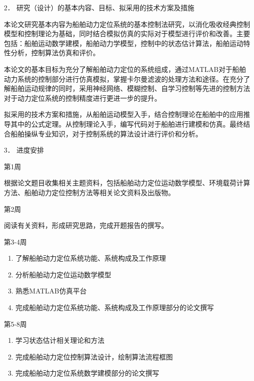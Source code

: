 \documentclass[a4paper,fontset=fandol]{ctexart}
\begin{document}
\begin{mdframed}
{\large \fangsong 
\begin{flushleft}
2．	研究（设计）的基本内容、目标、拟采用的技术方案及措施
\end{flushleft}

本论文研究基本内容为船舶动力定位系统的基本控制法研究，以消化吸收经典控制模型和控制理论为基础，同时结合模拟仿真的实际对于模型进行评价和改善。主要包括：船舶运动数学建模，船舶动力学模型，控制中的状态估计算法，船舶运动特性分析，控制算法仿真和评价。

本论文的基本目标为充分了解船舶动力定位的系统组成，通过MATLAB对于船舶动力系统的控制部分进行仿真模拟，掌握卡尔曼滤波的处理方法和途径。在充分了解船舶运动规律的同时，采用神经网络、模糊控制、自学习控制等先进的控制方法对于动力定位系统的控制精度进行更进一步的提升。

拟采用的技术方案和措施，从船舶运动模型入手，结合控制理论在船舶中的应用推导其中的公式定理。从控制理论入手，编写代码对于船舶进行建模和仿真。最终结合船舶操纵专业知识，对于控制系统的算法设计进行评价和分析。 

\begin{flushleft}
3．	进度安排
\end{flushleft}

第1周 

根据论文题目收集相关主题资料，包括船舶动力定位运动数学模型、环境载荷计算方法、船舶动力定位控制方法等相关论文资料及出版物。

第2周 

阅读有关资料，形成研究思路，完成开题报告的撰写。

第3-4周 
\begin{enumerate}
\item 了解船舶动力定位系统功能、系统构成及工作原理
\item 分析船舶动力定位运动数学模型
\item 熟悉MATLAB仿真平台
\item 完成船舶动力定位系统功能、系统构成及工作原理部分的论文撰写

\end{enumerate}

第5-8周 
\begin{enumerate}
\item 学习状态估计相关理论和方法
\item 完成船舶动力定位控制算法设计，绘制算法流程框图
\item 完成船舶动力定位系统数学建模部分的论文撰写
\end{enumerate}

}
\end{mdframed}
\end{document}
